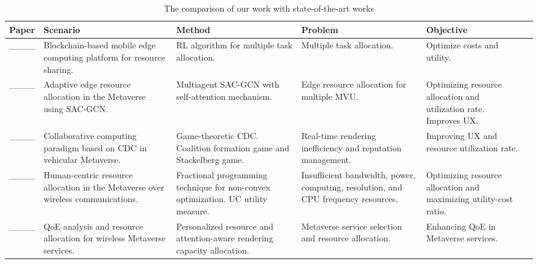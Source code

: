 \begin{table*}[http]
	\scriptsize
    \caption{The comparison of our work with state-of-the-art works}
	\label{tab.1}
	\centering
	 \begin{tabular}{|p{0.8cm}| p{3.9cm}| p{3.6cm}| p{3.5cm}| p{3.8cm}| p{4.5cm}| }
    \hline
  \textbf{Paper} & \textbf{Scenario}&\textbf{Method}&\textbf{Problem}&\textbf{Objective}\\
		\hline
   ____ & Blockchain-based mobile edge computing platform for resource sharing.&RL algorithm for multiple task allocation. & Multiple task allocation.
 & Optimize costs and utility. \\
   \hline
   ____ & Adaptive edge resource allocation in the Metaverse using SAC-GCN.&Multiagent SAC-GCN with self-attention mechanism. & Edge resource allocation for multiple MVU. & Optimizing resource allocation and utilization rate. Improves UX. 
\\
		\hline
  ____ &Collaborative computing paradigm based on CDC in vehicular Metaverse. & Game-theoretic CDC. Coalition formation game and Stackelberg game.  &Real-time rendering inefficiency
and reputation management.
 &Improving UX and resource utilization rate. \\
  \hline
____ & Human-centric resource allocation in the Metaverse over wireless communications. & Fractional programming technique for non-convex optimization. UC utility measure. &Insufficient bandwidth, power, computing, resolution, and CPU frequency resources.
 &Optimizing resource allocation and maximizing utility-cost ratio.\\
\hline
 ____ & QoE analysis and resource allocation for wireless Metaverse services. &Personalized resource and attention-aware rendering capacity allocation. & Metaverse
service selection and resource allocation. & Enhancing QoE in Metaverse services.
\\
		\hline


\end{tabular}
\end{table*}
